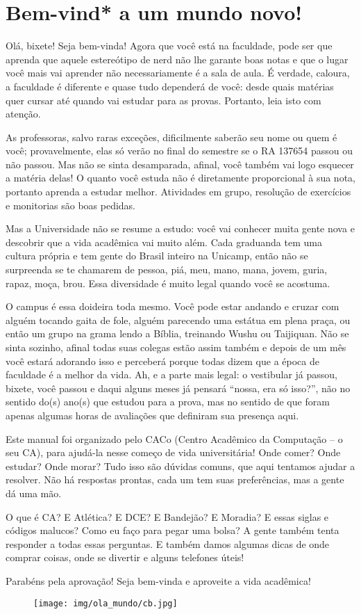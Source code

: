 
\section{Bem-vind* a um mundo novo!}

Olá, bixete! Seja bem-vinda! Agora que você está na faculdade, pode ser que
aprenda que aquele estereótipo de nerd não lhe garante boas notas e que o lugar
você mais vai aprender não necessariamente é a sala de aula. É verdade,
caloura, a faculdade é diferente e quase tudo dependerá de você: desde quais
matérias quer cursar até quando vai estudar para as provas. Portanto, leia isto
com atenção.

As professoras, salvo raras exceções, dificilmen\-te saberão seu nome ou quem é
você; provavelmente, elas só verão no final do semestre se o RA 137654 passou
ou não passou. Mas não se sinta desamparada, afinal, você também vai logo
esquecer a matéria delas! O quanto você estuda não é diretamente proporcional à
sua nota, portanto aprenda a estudar melhor. Atividades em grupo, resolução de
exercícios e monitorias são boas pedidas.

Mas a Universidade não se resume a estudo: você vai conhecer muita gente nova e
descobrir que a vida acadêmica vai muito além.  Cada graduanda tem uma cultura
própria e tem gente do Brasil inteiro na Unicamp, então não se surpreenda se te
chamarem de pessoa, piá, meu, mano, mana, jovem, guria, rapaz, moça, brou.
Essa diversidade é muito legal quando você se acostuma.

O campus é essa doideira toda mesmo. Você pode estar andando e cruzar com
alguém tocando gaita de fole, alguém parecendo uma estátua em plena praça, ou
então um grupo na grama lendo a Bíblia, treinando Wushu ou Taijiquan. Não se
sinta sozinho, afinal todas suas colegas estão assim também e depois de um mês
você estará adorando isso e perceberá porque todas dizem que a época de
faculdade é a melhor da vida. Ah, e a parte mais legal: o vestibular já passou,
bixete, você passou e daqui alguns meses já pensará ``nossa, era só isso?'',
não no sentido do(s) ano(s) que estudou para a prova, mas no sentido de que
foram apenas algumas horas de avaliações que definiram sua presença aqui.

Este manual foi organizado pelo CACo (Centro Acadêmico da Computação -- o seu
CA), para ajudá-la nesse começo de vida universitária! Onde comer? Onde
estudar? Onde morar? Tudo isso são dúvidas comuns, que aqui tentamos ajudar a
resolver. Não há respostas prontas, cada um tem suas preferências, mas a gente
dá uma mão.

O que é CA? E Atlética? E DCE? E Bandejão? E Moradia? E essas siglas e códigos
malucos? Como eu faço para pegar uma bolsa? A gente também tenta responder a
todas essas perguntas. E também damos algumas dicas de onde comprar coisas,
onde se divertir e alguns telefones úteis!

Parabéns pela aprovação! Seja bem-vinda e aproveite a vida acadêmica!

\begin{figure}[t]
    \texttt{[image: img/ola\_mundo/cb.jpg]}
\end{figure}
